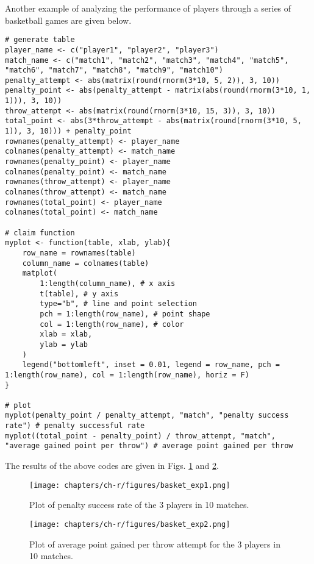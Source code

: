 Another example of analyzing the performance of players through a series of basketball games are given below.
\begin{lstlisting}
# generate table
player_name <- c("player1", "player2", "player3")
match_name <- c("match1", "match2", "match3", "match4", "match5", "match6", "match7", "match8", "match9", "match10")
penalty_attempt <- abs(matrix(round(rnorm(3*10, 5, 2)), 3, 10))
penalty_point <- abs(penalty_attempt - matrix(abs(round(rnorm(3*10, 1, 1))), 3, 10))
throw_attempt <- abs(matrix(round(rnorm(3*10, 15, 3)), 3, 10))
total_point <- abs(3*throw_attempt - abs(matrix(round(rnorm(3*10, 5, 1)), 3, 10))) + penalty_point
rownames(penalty_attempt) <- player_name
colnames(penalty_attempt) <- match_name
rownames(penalty_point) <- player_name
colnames(penalty_point) <- match_name
rownames(throw_attempt) <- player_name
colnames(throw_attempt) <- match_name
rownames(total_point) <- player_name
colnames(total_point) <- match_name

# claim function
myplot <- function(table, xlab, ylab){
    row_name = rownames(table)
    column_name = colnames(table)
    matplot(
    	1:length(column_name), # x axis
    	t(table), # y axis
    	type="b", # line and point selection
    	pch = 1:length(row_name), # point shape
    	col = 1:length(row_name), # color
    	xlab = xlab,
    	ylab = ylab
    )
    legend("bottomleft", inset = 0.01, legend = row_name, pch = 1:length(row_name), col = 1:length(row_name), horiz = F)
}

# plot
myplot(penalty_point / penalty_attempt, "match", "penalty success rate") # penalty successful rate
myplot((total_point - penalty_point) / throw_attempt, "match", "average gained point per throw") # average point gained per throw
\end{lstlisting}

The results of the above codes are given in Figs. \ref{ch:r1:fig:basket_exp1} and \ref{ch:r1:fig:basket_exp2}.

\begin{figure}
	\centering
	\texttt{[image: chapters/ch-r/figures/basket\_exp1.png]}
	\caption{Plot of penalty success rate of the 3 players in 10 matches.} \label{ch:r1:fig:basket_exp1}
\end{figure}

\begin{figure}
	\centering
	\texttt{[image: chapters/ch-r/figures/basket\_exp2.png]}
	\caption{Plot of average point gained per throw attempt for the 3 players in 10 matches.} \label{ch:r1:fig:basket_exp2}
\end{figure}

